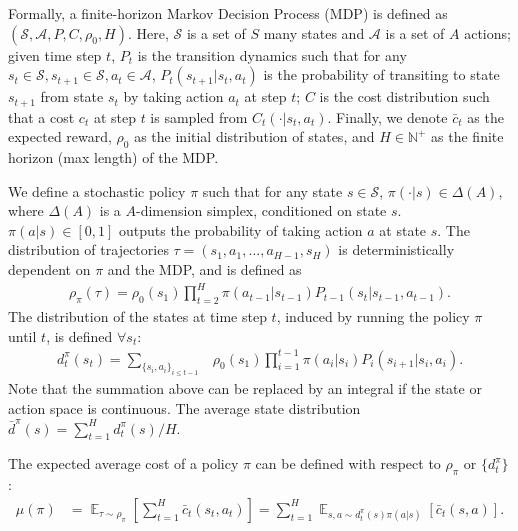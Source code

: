 \documentclass{article}
\begin{document}
Formally, a finite-horizon Markov Decision Process (MDP) is defined as $(\mathcal{S}, \mathcal{A}, P, C, \rho_0, H)$. Here, $\mathcal{S}$ is a set of $S$ many states and $\mathcal{A}$ is a set of $A$ actions; given time step $t$, $P_t$ is the transition dynamics such that for any $s_t\in\mathcal{S},s_{t+1}\in\mathcal{S}, a_t\in\mathcal{A}$, $P_t(s_{t+1}|s_t, a_t)$ is the probability of transiting to state $s_{t+1}$ from state $s_t$ by taking action $a_t$ at step $t$; $C$ is the cost distribution such that a cost $c_t$ at step $t$ is sampled from $C_t(\cdot | s_t, a_t)$. Finally, we denote $\bar{c}_t$ as the expected reward, $\rho_0$ as the initial distribution of states, and $H\in\mathbb{N}^+$ as the finite horizon (max length) of the MDP. 

We define a stochastic policy $\pi$ such that for any state $s\in\mathcal{S}$, $\pi(\cdot | s)\in \Delta(A)$, where $\Delta(A)$ is a $A$-dimension simplex, conditioned on state $s$. $\pi(a|s)\in[0,1]$ outputs the probability of taking action $a$ at state $s$. The distribution of trajectories $\tau = (s_1, a_1, \hdots,a_{H-1}, s_H)$ is deterministically dependent on $\pi$ and the MDP, and is defined as
\begin{align}
\rho_{\pi}(\tau) = \rho_0(s_1) \prod_{t=2}^{H} \pi(a_{t-1}|s_{t-1})P_{t-1}(s_t|s_{t-1}, a_{t-1}).\nonumber
\end{align}
%
%
The distribution of the states at time step $t$, induced by running the policy $\pi$ until $t$, is defined  $\forall s_t$:
\begin{align}
d_t^{\pi}(s_{t}) = \sum_{\{s_i,a_i\}_{i\leq t-1}} &\rho_{0}(s_1)\prod_{i=1}^{t-1}\pi(a_i|s_i)P_{i}(s_{i+1}|s_{i},a_{i}). \nonumber
\end{align} Note that the summation above can be replaced by an integral if the state or action space is continuous. The average state distribution $\bar{d}^{\pi}(s) = \sum_{t=1}^H d_t^{\pi}(s) / H$. 

The expected average cost of a policy $\pi$ can be defined with respect to $\rho_{\pi}$ or $\{d_t^{\pi}\}$:
\begin{align}
\mu(\pi) &= \mathop{\mathbb{E}}_{\tau\sim \rho_{\pi}}[\sum_{t=1}^H \bar{c}_t(s_t,a_t)]  = \sum_{t=1}^H\mathop{\mathbb{E}}_{s,a\sim {d}_t^{\pi}(s)\pi(a|s)}[\bar{c}_t(s,a)].\nonumber
\end{align}
\end{document}
